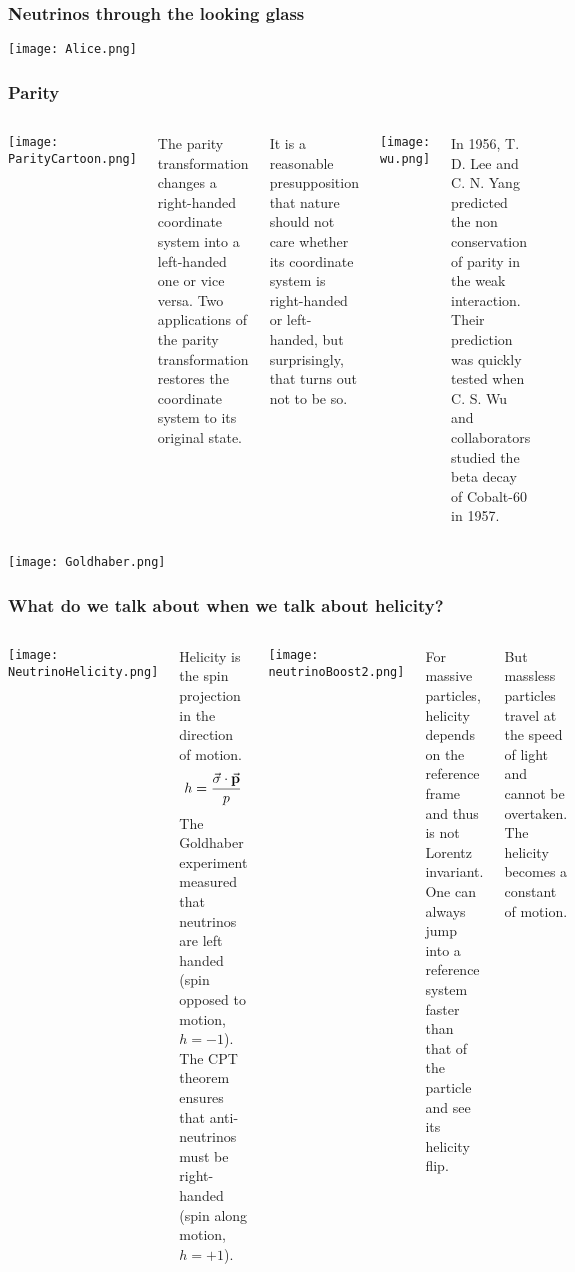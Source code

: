 \begin{frame}
\frametitle{Neutrinos through the looking glass}

\texttt{[image: Alice.png]}

\end{frame}


\begin{frame}
\frametitle{Parity}
\begin{columns}
\texttt{[image: ParityCartoon.png]}


The parity transformation changes a right-handed coordinate system into a left-handed one or vice versa. Two applications of the parity transformation restores the coordinate system to its original state.

It is a reasonable presupposition that nature should not care whether its coordinate system is right-handed or left-handed, \alert{but surprisingly, that turns out not to be so.}

\texttt{[image: wu.png]}

In 1956, T. D. Lee and C. N. Yang predicted the non conservation of parity in the weak interaction. Their prediction was quickly tested when C. S. Wu and collaborators studied the beta decay of Cobalt-60 in 1957.

\end{columns}

\end{frame}

\begin{frame}
\texttt{[image: Goldhaber.png]}

\end{frame}

\begin{frame}
\frametitle{What do we talk about when we talk about helicity?}
\begin{columns}
\texttt{[image: NeutrinoHelicity.png]}

Helicity is the spin projection in the direction of motion.
\[
h = \frac{\va{\sigma}\cdot \va{p}}{p}
\]
The Goldhaber experiment measured that neutrinos are left handed (spin opposed to motion, $h=-1$). The CPT theorem ensures that anti-neutrinos must be right-handed (spin along motion, $h=+1$).

\texttt{[image: neutrinoBoost2.png]}

For massive particles, helicity depends on the reference frame and thus is not Lorentz invariant. One can always jump into a reference system faster than that of the particle and see its helicity flip.

But massless particles travel at the speed of light and cannot be overtaken. The helicity becomes a constant of motion. 
\end{columns}

\end{frame}

